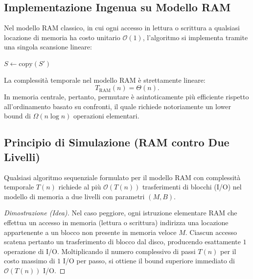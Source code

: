 \FloatBarrier
\subsection{Implementazione Ingenua su Modello RAM}
\label{subsec:naive-ram}

Nel modello RAM classico, in cui ogni accesso in lettura o scrittura a qualsiasi locazione di memoria ha costo unitario $\mathcal{O}(1)$, l'algoritmo si implementa tramite una singola scansione lineare:

\begin{algorithm}[H]
  \DontPrintSemicolon
  $S \leftarrow \mathrm{copy}(S')$\;
  \caption{Permutazione Diretta su RAM}
\end{algorithm}

La complessità temporale nel modello RAM è strettamente lineare:
\[
  T_{\mathrm{RAM}}(n) = \Theta(n).
\]
In memoria centrale, pertanto, permutare è asintoticamente più efficiente rispetto all'ordinamento basato su confronti, il quale richiede notoriamente un lower bound di $\Omega(n \log n)$ operazioni elementari.

\FloatBarrier
\subsection{Principio di Simulazione (RAM contro Due Livelli)}
\label{subsec:simulation-principle}

\begin{theorem}
\label{thm:simulation}
Qualsiasi algoritmo sequenziale formulato per il modello RAM con complessità temporale $T(n)$ richiede al più $\mathcal{O}(T(n))$ trasferimenti di blocchi (I/O) nel modello di memoria a due livelli con parametri $(M, B)$.
\end{theorem}

\begin{proof}[Dimostrazione (Idea)]
Nel caso peggiore, ogni istruzione elementare RAM che effettua un accesso in memoria (lettura o scrittura) indirizza una locazione appartenente a un blocco non presente in memoria veloce $M$. Ciascun accesso scatena pertanto un trasferimento di blocco dal disco, producendo esattamente $1$ operazione di I/O. Moltiplicando il numero complessivo di passi $T(n)$ per il costo massimo di $1$ I/O per passo, si ottiene il bound superiore immediato di $\mathcal{O}(T(n))$ I/O.
\end{proof}

